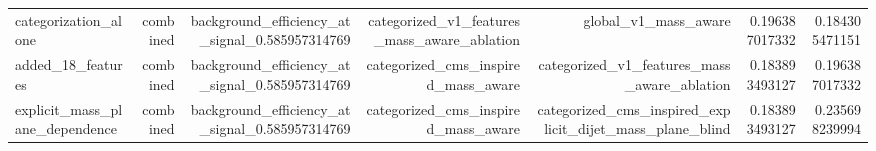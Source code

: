 \begin{table}[htbp]
{\begin{tabular}{lrrrrrr}
categorization\_alone & combined & background\_efficiency\_at\_signal\_0.585957314769 & categorized\_v1\_features\_mass\_aware\_ablation & global\_v1\_mass\_aware & 0.196387017332 & 0.184305471151 \\
added\_18\_features & combined & background\_efficiency\_at\_signal\_0.585957314769 & categorized\_cms\_inspired\_mass\_aware & categorized\_v1\_features\_mass\_aware\_ablation & 0.183893493127 & 0.196387017332 \\
explicit\_mass\_plane\_dependence & combined & background\_efficiency\_at\_signal\_0.585957314769 & categorized\_cms\_inspired\_mass\_aware & categorized\_cms\_inspired\_explicit\_dijet\_mass\_plane\_blind & 0.183893493127 & 0.235698239994 \\
\bottomrule
\end{tabular}
}
\end{table}
